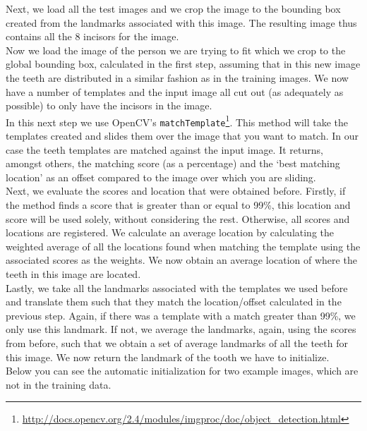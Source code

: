 \documentclass[11pt]{article}
\begin{document}
\newline
Next, we load all the test images and we crop the image to the bounding box created from the landmarks associated with this image. The resulting image thus contains all the 8 incisors for the image.\\
\newline
Now we load the image of the person we are trying to fit which we crop to the global bounding box, calculated in the first step, assuming that in this new image the teeth are distributed in a similar fashion as in the training images. We now have a number of templates and the input image all cut out (as adequately as possible) to only have the incisors in the image.\\
\newline
In this next step we use OpenCV's \texttt{matchTemplate}\footnote{\url{http://docs.opencv.org/2.4/modules/imgproc/doc/object_detection.html}}. This method will take the templates created and slides them over the image that you want to match. In our case the teeth templates are matched against the input image. It returns, amongst others, the matching score (as a percentage) and the `best matching location' as an offset compared to the image over which you are sliding.\\
\newline
Next, we evaluate the scores and location that were obtained before. Firstly, if the method finds a score that is greater than or equal to 99\%, this location and score will be used solely, without considering the rest. Otherwise, all scores and locations are registered. We calculate an average location by calculating the weighted average of all the locations found when matching the template using the associated scores as the weights. We now obtain an average location of where the teeth in this image are located. \\
\newline
Lastly, we take all the landmarks associated with the templates we used before and translate them such that they match the location/offset calculated in the previous step. Again, if there was a template with a match greater than 99\%, we only use this landmark. If not, we average the landmarks, again, using the scores from before, such that we obtain a set of average landmarks of all the teeth for this image. We now return the landmark of the tooth we have to initialize.\\
\newline
Below you can see the automatic initialization for two example images, which are not in the training data.
\end{document}
